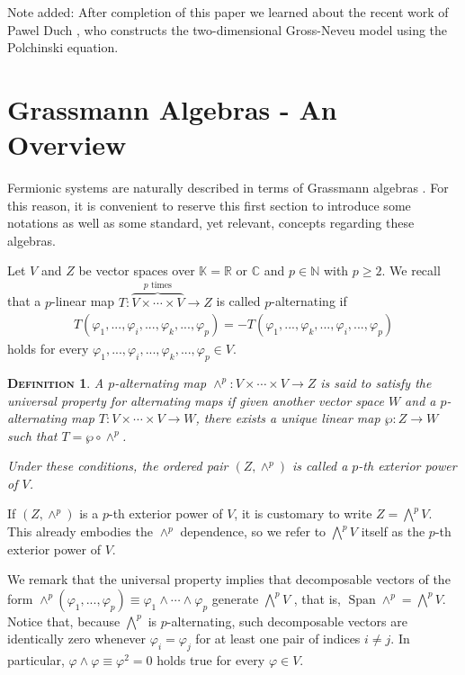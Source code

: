 \documentclass[12pt,twoside]{amsart}
\newtheorem{defi}{\textsc{Definition}}[section]
\numberwithin{equation}{section}
\begin{document}
Note added: After completion of this paper we learned about the recent work of Pawel Duch \cite{Duch}, who constructs the two-dimensional Gross-Neveu model using the Polchinski equation. 


\section{Grassmann Algebras - An Overview}\label{grassmannoverview}

Fermionic systems are naturally described in terms of Grassmann algebras \cite{berezin2012method}. For this reason, it is convenient to reserve this first section to introduce some notations as well as some standard, yet relevant, concepts regarding these algebras.

Let $V$ and $Z$ be vector spaces over $\mathbb{K} = \mathbb{R}$ or $\mathbb{C}$ and $p \in \mathbb{N}$ with $p \ge 2$. We recall that a $p$-linear map $T: \overbrace{V\times \cdots \times V}^{\text{$p$ times}} \to Z$ is called $p$-alternating if
\begin{eqnarray}
T(\varphi_{1},...,\varphi_{i},...,\varphi_{k},...,\varphi_{p}) = -T(\varphi_{1},...,\varphi_{k},...,\varphi_{i},...,\varphi_{p}) \label{GA1}
\end{eqnarray}
holds for every $\varphi_{1},...,\varphi_{i},...,\varphi_{k},...,\varphi_{p}\in V$. 

\begin{defi}\label{exteriorpower} A $p$-alternating map $\wedge^{p}: V \times \cdots \times V \to Z$ is said to satisfy the universal property for alternating maps if given another vector space $W$ and a $p$-alternating map $T: V \times \cdots \times V \to W$, there exists a unique linear map $\wp : Z \to W$ such that $T = \wp \circ \wedge^{p}$.

Under these conditions, the ordered pair $(Z,\wedge^{p})$ is called a $p$-th exterior power of $V$.
\end{defi}

If $(Z,\wedge^{p})$ is a $p$-th exterior power of $V$, it is customary to write $Z = \bigwedge^{p}V$. This already embodies the $\wedge^{p}$ dependence, so we refer to $\bigwedge^{p}V$ itself as the $p$-th exterior power of $V$. 

We remark that the universal property implies that decomposable vectors of the form $\wedge^{p}(\varphi_{1},...,\varphi_{p}) \equiv \varphi_{1}\wedge \cdots \wedge \varphi_{p}$ generate $\bigwedge^{p} V$ \cite{Greub}, that is, $\operatorname{Span}\wedge^{p} = \bigwedge^{p}V$. Notice that, because $\bigwedge^{p}$ is $p$-alternating, such decomposable vectors are identically zero whenever $\varphi_{i} = \varphi_{j}$ for at least one pair of indices $i \neq j$. In particular, $\varphi \wedge \varphi \equiv \varphi^{2} = 0$ holds true for every $\varphi \in V$. 
\end{document}
